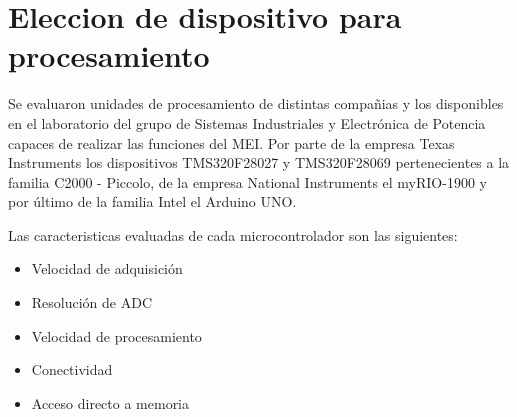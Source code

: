 \section{Eleccion de dispositivo para procesamiento}%
  \par Se evaluaron unidades de procesamiento de distintas compañias y los
  disponibles en el laboratorio del grupo de Sistemas Industriales y Electrónica
  de Potencia capaces de realizar las funciones del MEI. Por parte de la empresa
  Texas Instruments los dispositivos TMS320F28027 y TMS320F28069 pertenecientes
  a la familia C2000 - Piccolo, de la empresa National Instruments el myRIO-1900
  y por último de la familia Intel el Arduino UNO.

  Las caracteristicas evaluadas de cada microcontrolador son las siguientes:
  \begin{itemize}
    \item Velocidad de adquisición
    \item Resolución de ADC
    \item Velocidad de procesamiento
    \item Conectividad
    \item Acceso directo a memoria
  \end{itemize}

  \begin{table}[H]
  \centering
  \caption{\label{Especificaciones_dispositivos_comerciales_evaluados}Especificaciones de los dispositivos comerciales evaluados}
  \end{table}

